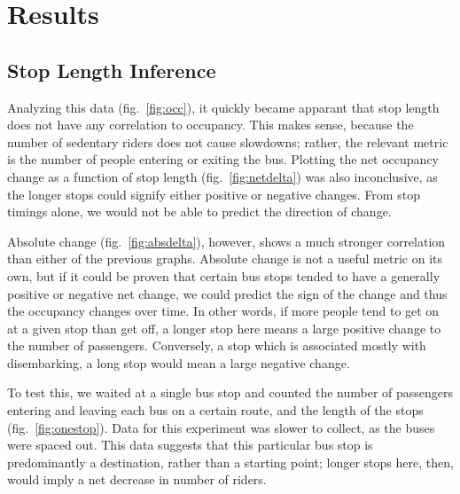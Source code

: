 \section{Results}

\subsection*{Stop Length Inference}

Analyzing this data (fig.~\ref{fig:occ}), it quickly became apparant that stop length does not have any correlation to occupancy.
This makes sense, because the number of sedentary riders does not cause slowdowns; rather, the relevant metric is the number of people entering or exiting the bus.
Plotting the net occupancy change as a function of stop length (fig.~\ref{fig:netdelta}) was also inconclusive, as the longer stops could signify either positive or negative changes.
From stop timings alone, we would not be able to predict the direction of change.
    

Absolute change (fig.~\ref{fig:absdelta}), however, shows a much stronger correlation than either of the previous graphs.
Absolute change is not a useful metric on its own, but if it could be proven that certain bus stops tended to have a generally positive or negative net change, we could predict the sign of the change and thus the occupancy changes over time.
In other words, if more people tend to get on at a given stop than get off, a longer stop here means a large positive change to the number of passengers.
Conversely, a stop which is associated mostly with disembarking, a long stop would mean a large negative change.

To test this, we waited at a single bus stop and counted the number of passengers entering and leaving each bus on a certain route, and the length of the stops (fig.~\ref{fig:onestop}).
Data for this experiment was slower to collect, as the buses were spaced out.
This data suggests that this particular bus stop is predominantly a destination, rather than a starting point; longer stops here, then, would imply a net decrease in number of riders.
    

